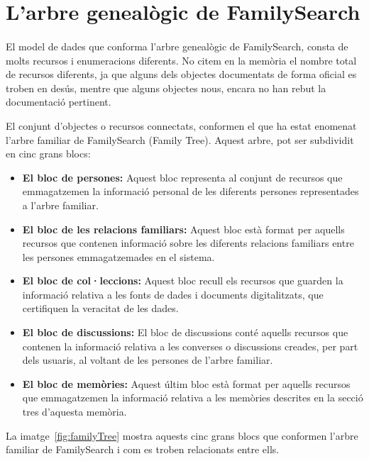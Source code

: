 \section{L'arbre genealògic de FamilySearch}

    \paragraph{}
    El model de dades que conforma l'arbre genealògic de FamilySearch, consta de molts recursos i enumeracions diferents. No citem en la memòria el nombre total de recursos diferents, ja que alguns dels objectes documentats de forma oficial es troben en desús, mentre que alguns objectes nous, encara no han rebut la documentació pertinent.

    El conjunt d'objectes o recursos connectats, conformen el que ha estat enomenat l'arbre familiar de FamilySearch (Family Tree). Aquest arbre, pot ser subdividit en cinc grans blocs:

    \begin{itemize}
        \item \textbf{El bloc de persones:} Aquest bloc representa al conjunt de recursos que emmagatzemen la informació personal de les diferents persones representades a l'arbre familiar.
        \item \textbf{El bloc de les relacions familiars:} Aquest bloc està format per aquells recursos que contenen informació sobre les diferents relacions familiars entre les persones emmagatzemades en el sistema.
        \item \textbf{El bloc de col·leccions:} Aquest bloc recull els recursos que guarden la informació relativa a les fonts de dades i documents digitalitzats, que certifiquen la veracitat de les dades.
        \item \textbf{El bloc de discussions:} El bloc de discussions conté aquells recursos que contenen la informació relativa a les converses o discussions creades, per part dels usuaris, al voltant de les persones de l'arbre familiar.
        \item \textbf{El bloc de memòries:} Aquest últim bloc està format per aquells recursos que emmagatzemen la informació relativa a les memòries descrites en la secció tres d'aquesta memòria.
    \end{itemize}

    La imatge~\ref{fig:familyTree} mostra aquests cinc grans blocs que conformen l'arbre familiar de FamilySearch i com es troben relacionats entre ells.

